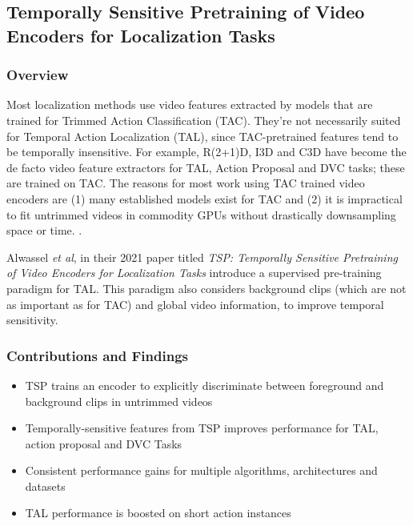 \subsection{Temporally Sensitive Pretraining of Video Encoders for Localization Tasks} \label{appendix:tsp-paper}

\subsubsection{Overview}
Most localization methods use video features extracted by models that are trained for Trimmed 
Action Classification (TAC). They're not necessarily suited for Temporal Action Localization 
(TAL), since TAC-pretrained features tend to be temporally insensitive. For example, R(2+1)D, 
I3D and C3D have become the de facto video feature extractors for TAL, Action Proposal and DVC 
tasks; these are trained on TAC. The reasons for most work using TAC trained video encoders 
are (1) many established models exist for TAC and (2) it is impractical to fit untrimmed 
videos in commodity GPUs without drastically downsampling space or time. 
\cite{alwassel2021tsp}. 

\par Alwassel \textit{et al}, in their 2021 paper titled \textit{TSP: Temporally Sensitive 
Pretraining of Video Encoders for Localization Tasks} introduce a supervised pre-training 
paradigm for TAL. This paradigm also considers background clips (which are not as important as 
for TAC) and global video information, to improve temporal sensitivity.

\subsubsection{Contributions and Findings}
\begin{itemize}
\item TSP trains an encoder to explicitly discriminate between foreground and background clips in untrimmed videos
\item Temporally-sensitive features from TSP improves performance for TAL, action proposal and DVC Tasks
\item Consistent performance gains for multiple algorithms, architectures and datasets
\item TAL performance is boosted on short action instances
\end{itemize}

